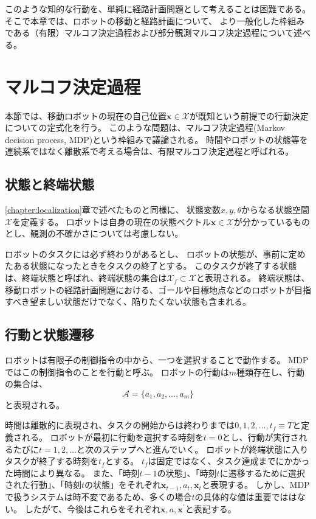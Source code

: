 このような知的な行動を、単純に経路計画問題として考えることは困難である。
そこで本章では、ロボットの移動と経路計画について、
より一般化した枠組みである（有限）マルコフ決定過程および部分観測マルコフ決定過程について述べる。



\section{マルコフ決定過程} \label{section:mdp}
本節では、移動ロボットの現在の自己位置$\bm{x} \in \mathcal{X}$が既知という前提での行動決定についての定式化を行う。
このような問題は、マルコフ決定過程(Markov decision process, MDP)という枠組みで議論される。
時間やロボットの状態等を連続系ではなく離散系で考える場合は、有限マルコフ決定過程と呼ばれる。

\subsection{状態と終端状態}
\ref{chapter:localization}章で述べたものと同様に、
状態変数$x,y,\theta$からなる状態空間$\mathcal{X}$を定義する。
ロボットは自身の現在の状態ベクトル$\bm{x} \in \mathcal{X}$が分かっているものとし、観測の不確かさについては考慮しない。

ロボットのタスクには必ず終わりがあるとし、
ロボットの状態が、事前に定めたある状態になったときをタスクの終了とする。
このタスクが終了する状態は、終端状態と呼ばれ、終端状態の集合は$\mathcal{X}_f \subset \mathcal{X}$と表現される。
終端状態は、移動ロボットの経路計画問題における、ゴールや目標地点などのロボットが目指すべき望ましい状態だけでなく、陥りたくない状態も含まれる。

\subsection{行動と状態遷移}
ロボットは有限子の制御指令の中から、一つを選択することで動作する。
MDPではこの制御指令のことを行動と呼ぶ。
ロボットの行動は$m$種類存在し、行動の集合は、
\begin{equation}
\label{action}
  \mathcal{A} = \{ a_{1}, a_{2}, \ldots , a_{m} \}
\end{equation}
と表現される。

時間は離散的に表現され、タスクの開始からは終わりまでは${0,1,2,\ldots,t_{f}} \equiv T$と定義される。
ロボットが最初に行動を選択する時刻を$t=0$とし、行動が実行されるたびに$t=1,2,\ldots$と次のステップへと進んでいく。
ロボットが終端状態に入りタスクが終了する時刻を$t_{f}$とする。
$t_{f}$は固定ではなく、タスク達成までにかかった時間により異なる。
また、「時刻$t-1$の状態」、「時刻$t$に遷移するために選択された行動」、「時刻$t$の状態」をそれぞれ$\bm{x}_{t-1}, a_{t}, \bm{x}_{t}$と表現する。
しかし、MDPで扱うシステムは時不変であるため、多くの場合$t$の具体的な値は重要でははない。
したがて、今後はこれらをそれぞれ$\bm{x}, a, \bm{x}^{\prime}$と表記する。

